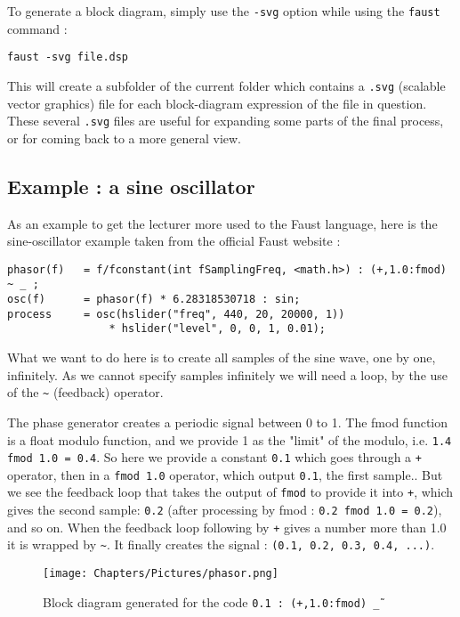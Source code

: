 To generate a block diagram, simply use the \texttt{-svg} option while using the \texttt{faust} command :

\centerline{\texttt{faust -svg file.dsp}}

This will create a subfolder of the current folder which contains a \texttt{.svg} (scalable vector graphics) file for each block-diagram expression of the file in question. These several \texttt{.svg} files are useful for expanding some parts of the final process, or for coming back to a more general view.


\subsection{Example : a sine oscillator}

As an example to get the lecturer more used to the Faust language, here is the sine-oscillator example taken from the official Faust website \cite{faustsine}:

\begin{lstlisting}
phasor(f)   = f/fconstant(int fSamplingFreq, <math.h>) : (+,1.0:fmod) ~ _ ;
osc(f)      = phasor(f) * 6.28318530718 : sin;
process     = osc(hslider("freq", 440, 20, 20000, 1)) 
                * hslider("level", 0, 0, 1, 0.01);
\end{lstlisting}

What we want to do here is to create all samples of the sine wave, one by one, infinitely. As we cannot specify samples infinitely we will need a loop, by the use of the \texttt{\~} (feedback) operator.

The phase generator creates a periodic signal between 0 to 1. The fmod function is a float modulo function, and we provide 1 as the "limit" of the modulo, i.e. \texttt{1.4 fmod 1.0 = 0.4}. So here we provide a constant \texttt{0.1} which goes through a \texttt{+} operator, then in a \texttt{fmod 1.0} operator, which output \texttt{0.1}, the first sample.. But we see the feedback loop that takes the output of \texttt{fmod} to provide it into \texttt{+}, which gives the second sample: \texttt{0.2} (after processing by fmod : \texttt{0.2 fmod 1.0 = 0.2}), and so on. When the feedback loop following by \texttt{+} gives a number more than 1.0 it is wrapped by \texttt{\~}. It finally creates the signal : \texttt{(0.1, 0.2, 0.3, 0.4, ...)}.

\begin{figure}[h]
    \centering
    \texttt{[image: Chapters/Pictures/phasor.png]}
    \caption{Block diagram generated for the code \texttt{0.1 : (+,1.0:fmod) \~ \_}}
    \label{fig:phasor}
\end{figure}

